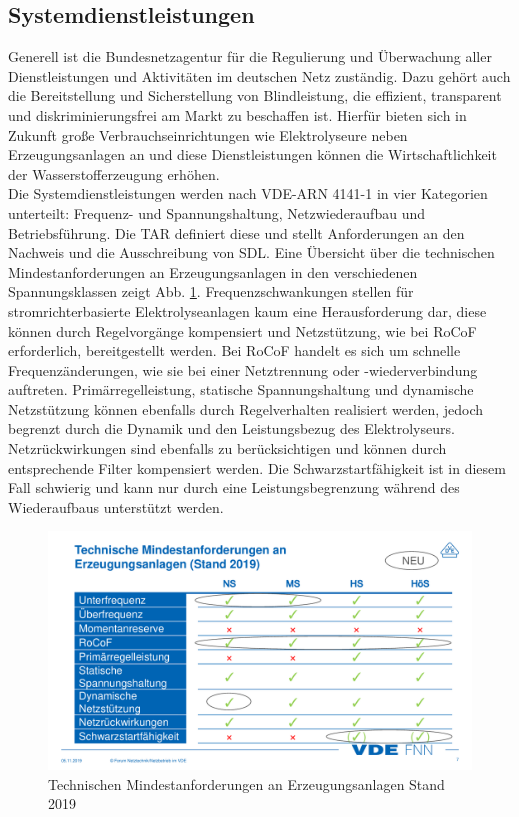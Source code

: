 	\subsection{Systemdienstleistungen}
	Generell ist die Bundesnetzagentur für die Regulierung und Überwachung aller Dienstleistungen und Aktivitäten im deutschen Netz zuständig. Dazu gehört auch die Bereitstellung und Sicherstellung von Blindleistung, die effizient, transparent und diskriminierungsfrei am Markt zu beschaffen ist. Hierfür bieten sich in Zukunft große Verbrauchseinrichtungen wie Elektrolyseure neben Erzeugungsanlagen an und diese Dienstleistungen können die Wirtschaftlichkeit der Wasserstofferzeugung erhöhen.\\
	Die Systemdienstleistungen werden nach VDE-ARN 4141-1 in vier Kategorien unterteilt: Frequenz- und Spannungshaltung, Netzwiederaufbau und Betriebsführung. Die \gls{TAR} definiert diese und stellt Anforderungen an den Nachweis und die Ausschreibung von \gls{SDL}. Eine Übersicht über die technischen Mindestanforderungen an Erzeugungsanlagen in den verschiedenen Spannungsklassen zeigt Abb. \ref{fig:vde-fnn-tar}. Frequenzschwankungen stellen für stromrichterbasierte Elektrolyseanlagen kaum eine Herausforderung dar, diese können durch Regelvorgänge kompensiert und Netzstützung, wie bei \gls{RoCoF} erforderlich, bereitgestellt werden. Bei \gls{RoCoF} handelt es sich um schnelle Frequenzänderungen, wie sie bei einer Netztrennung oder -wiederverbindung auftreten. Primärregelleistung, statische Spannungshaltung und dynamische Netzstützung können ebenfalls durch Regelverhalten realisiert werden, jedoch begrenzt durch die Dynamik und den Leistungsbezug des Elektrolyseurs. Netzrückwirkungen sind ebenfalls zu berücksichtigen und können durch entsprechende Filter kompensiert werden. Die Schwarzstartfähigkeit ist in diesem Fall schwierig und kann nur durch eine Leistungsbegrenzung während des Wiederaufbaus unterstützt werden.
	\begin{figure}
		\centering
		\includegraphics[width=0.9\linewidth]{content/Grafiken/VDE-FNN-TAR}
		\caption[Technische Mindestanforderungen an Erzeugungsanlagen Stand 2019]{Technischen Mindestanforderungen an Erzeugungsanlagen Stand 2019 \cite{VDEFNN2019SDL}}
		\label{fig:vde-fnn-tar}
	\end{figure}
	
